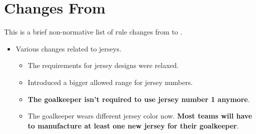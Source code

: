 \section{Changes From \LastRCYear}
This is a brief non-normative list of rule changes from \LastRCYear to \RCYear.

\begin{itemize}
	\item Various changes related to jerseys.
	\begin{itemize}
		\item The requirements for jersey designs were relaxed.
		\item Introduced a bigger allowed range for jersey numbers.
		\item \textbf{The goalkeeper isn't required to use jersey number 1 anymore}.
		\item The goalkeeper wears different jersey color now. \textbf{Most teams will have to manufacture at least one new jersey for their goalkeeper}.
	\end{itemize}
\end{itemize}

